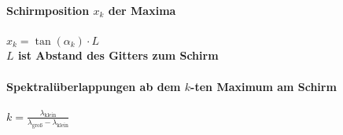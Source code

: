 \documentclass[12pt, a4paper]{scrreprt}
\begin{document}
\paragraph{Schirmposition \(x_k\) der Maxima} \dotfill \(x_k = \tan (\alpha_k) \cdot L\)\\
\myhspace{} \textbf{\(L\) ist Abstand des Gitters zum Schirm}
\paragraph{Spektralüberlappungen ab dem \(k\)-ten Maximum am Schirm} \dotfill \(k = \frac{\lambda_{\text{klein}}}{\lambda_{\text{groß}} - \lambda_{\text{klein}}}\)
\end{document}
